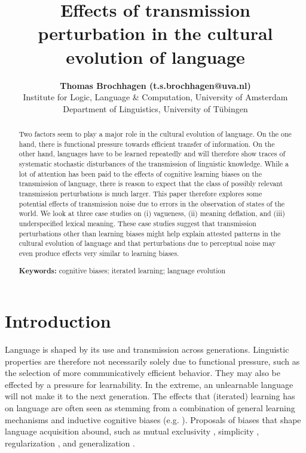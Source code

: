\documentclass[10pt,a4paper]{article}
\title{Effects of transmission perturbation in the cultural evolution of language}
\author{{\large \bf Thomas Brochhagen (t.s.brochhagen@uva.nl)}\\
  Institute for Logic, Language \& Computation, University of Amsterdam
  \AND {\large \bf Michael Franke (mchfranke@gmail.com)} \\
  Department of Linguistics, University of T\"{u}bingen}
\begin{document}
\maketitle

\begin{abstract}
  Two factors seem to play a major role in the cultural evolution of language. On the one hand,
  there is functional pressure towards efficient transfer of information. On the other hand,
  languages have to be learned repeatedly and will therefore show traces of systematic
  stochastic disturbances of the transmission of linguistic knowledge. While a lot of attention
  has been paid to the effects of cognitive learning biases on the transmission of language,
  there is reason to expect that the class of possibly relevant transmission perturbations is
  much larger. This paper therefore explores some potential effects of transmission noise due
  to errors in the observation of states of the world. We look at three case studies on (i)
  vagueness, (ii) meaning deflation, and (iii) underspecified lexical meaning. These case
  studies suggest that transmission perturbations other than learning biases might help explain
  attested patterns in the cultural evolution of language and that perturbations due to
  perceptual noise may even produce effects very similar to learning biases.

\textbf{Keywords:} 
cognitive biases; iterated learning; language evolution  
\end{abstract}


\section{Introduction}

Language is shaped by its use and transmission across generations. Linguistic properties are
therefore not necessarily solely due to functional pressure, such as the selection of more
communicatively efficient behavior. They may also be effected by a pressure for
learnability. In the extreme, an unlearnable language will not make it to the next
generation. The effects that (iterated) learning has on language are often seen as stemming
from a combination of general learning mechanisms and inductive cognitive biases
(e.g. \citealt{griffiths+kalish:2007,kirby+etal:2014,tamariz+kirby:2016}). Proposals of biases
that shape language acquisition abound, such as mutual exclusivity
\citep{merriman+bowman:1989,clark:2009}, simplicity \citep{kirby+etal:2015}, regularization
\citep{hudson+etal:2005}, and generalization \citep{smith:2011}.
\end{document}
